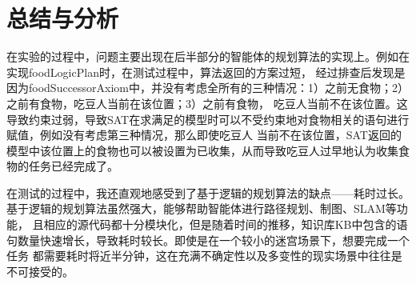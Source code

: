 \chapter{总结与分析}
%
%
在实验的过程中，问题主要出现在后半部分的智能体的规划算法的实现上。例如在实现foodLogicPlan时，在测试过程中，算法返回的方案过短，
经过排查后发现是因为foodSuccessorAxiom中，并没有考虑全所有的三种情况：1）之前无食物；2）之前有食物，吃豆人当前在该位置；3）之前有食物，
吃豆人当前不在该位置。这导致约束过弱，导致SAT在求满足的模型时可以不受约束地对食物相关的语句进行赋值，例如没有考虑第三种情况，那么即使吃豆人
当前不在该位置，SAT返回的模型中该位置上的食物也可以被设置为已收集，从而导致吃豆人过早地认为收集食物的任务已经完成了。

在测试的过程中，我还直观地感受到了基于逻辑的规划算法的缺点——耗时过长。基于逻辑的规划算法虽然强大，能够帮助智能体进行路径规划、制图、SLAM等功能，
且相应的源代码都十分模块化，但是随着时间的推移，知识库KB中包含的语句数量快速增长，导致耗时较长。即使是在一个较小的迷宫场景下，想要完成一个任务
都需要耗时将近半分钟，这在充满不确定性以及多变性的现实场景中往往是不可接受的。